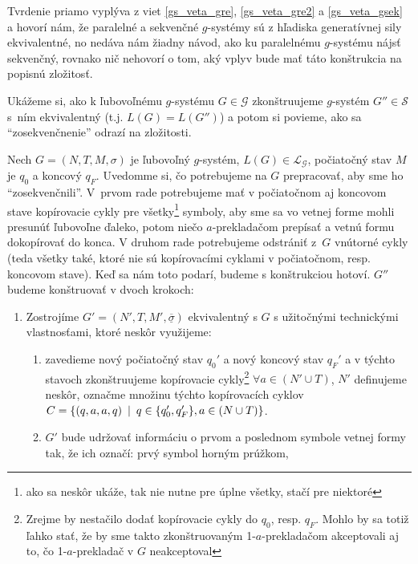 \begin{dokaz}
  Tvrdenie priamo vyplýva z viet \ref{gs_veta_gre}, \ref{gs_veta_gre2} a
  \ref{gs_veta_gsek} a hovorí nám, že paralelné a sekvenčné $g$-systémy
  sú z hľadiska generatívnej sily ekvivalentné, no nedáva nám žiadny
  návod, ako ku paralelnému $g$-systému nájsť sekvenčný, rovnako nič
  nehovorí o tom, aký vplyv bude mať táto konštrukcia na popisnú
  zložitosť.

  Ukážeme si, ako k ľubovoľnému $g$-systému $G\in\mathcal{G}$
  zkonštruujeme $g$-systém $G''\in\mathcal{S}$ \mbox{s ním}
  ekvivalentný (t.j. $L(G)=L(G'')$) a potom si povieme, ako sa
  ``zosekvenčnenie'' odrazí na zložitosti.

  Nech $G=(N,T,M,\sigma)$ je ľubovoľný $g$-systém,
  $L(G)\in\mathcal{L_G}$, počiatočný stav $M$ je $q_0$ a koncový
  $q_F$. Uvedomme si, čo potrebujeme na $G$ prepracovať, aby sme ho
  ``zosekvenčnili''. \mbox{V prvom} rade potrebujeme mať v
  po\-čia\-toč\-nom aj koncovom stave kopírovacie cykly pre
  všetky\footnote{ako sa neskôr ukáže, tak nie nutne pre úplne
  všetky, stačí pre niektoré} symboly, aby sme sa vo vetnej forme
  mohli presunúť ľubovoľne ďaleko, potom niečo $a$-prek\-la\-da\-čom
  prepísať a vetnú formu dokopírovať do konca. V druhom rade
  potrebujeme odstrániť \mbox{z $G$} vnútorné cykly (teda všetky
  také, ktoré nie sú kopírovacími cyklami v počiatočnom,
  \mbox{resp.} koncovom stave). Keď sa nám toto podarí, budeme s
  konštrukciou hotoví. $G''$ budeme konštruovať v dvoch krokoch:
  \begin{enumerate}
    \item Zostrojíme $G'=(N',T,M',\underline{\overline{\sigma}})$
    ekvivalentný s $G$ s užitočnými technickými vlastnosťami, ktoré
    neskôr využijeme:
    \begin{enumerate}
      \item zavedieme nový počiatočný stav $q_0'$ a nový koncový stav
      $q_F'$ a v týchto stavoch zkonštruujeme kopírovacie
      cykly\footnote{Zrejme by nestačilo dodať kopírovacie cykly do
      $q_0$, resp. $q_F$. Mohlo by sa totiž ľahko stať, že by sme takto
      zkonštruovaným 1-$a$-prekladačom akceptovali aj to, čo
      1-$a$-prekladač v $G$ neakceptoval} $\forall a\in(N'\cup T)$, $N'$
      definujeme neskôr, označme množinu týchto kopírovacích cyklov
      $C=\{(q,a,a,q)\enspace |\enspace q\in\{q'_0,q'_F\},a\in(N\cup T)\}$.
      \item $G'$ bude udržovať informáciu o prvom  a poslednom symbole
      vetnej formy tak, že ich označí: prvý symbol horným prúžkom,

\end{enumerate}
\end{enumerate}
\end{dokaz}
